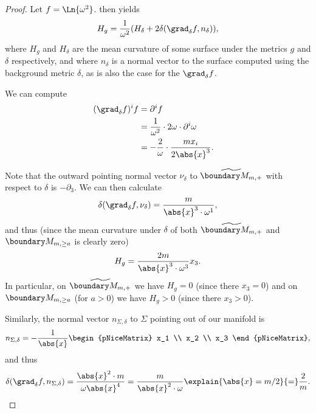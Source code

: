 \documentclass[titlepage,numbers=noenddot,oneside,%
cleardoublepage=empty,paper=a4,fontsize=11pt,%
english,%
]{scrartcl}
\begin{document}
\begin{proof}
    Let \( f=\Ln{\omega^2} \).  then yields
    \begin{equation*}
        H_{g}=\frac{1}{\omega^2}(H_{\delta}+2 \delta(\grad_\delta f,n_\delta)),
    \end{equation*}
    where \( H_g \) and \( H_\delta \) are the mean curvature of some surface under the metrics \( g \) and \( \delta \) respectively, and where \( n_\delta \) is a normal vector to the surface computed using the background metric \( \delta \), as is also the case for the \( \grad_{\delta} f \).

    We can compute
    \begin{align*}
        &(\grad_\delta f)^i f\begin{aligned}[t]
            &=\partial^i f\\
            &=\frac{1}{\omega^2}\cdot2 \omega\cdot \partial^i \omega\\
            &=-\frac{2}{\omega}\cdot \frac{m x_i}{2\abs{x}^3}.
        \end{aligned}
    \end{align*}
    
    Note that the outward pointing normal vector \( \nu_\delta \) to \( \schwarzschildboundary \) with respect to \( \delta \) is \( -\partial_3 \).  We can then calculate
    \begin{equation*}
        \delta(\grad_\delta f,\nu_\delta)=\frac{m}{\abs{x}^3\cdot \omega^1},
    \end{equation*}
    and thus (since the mean curvature under \( \delta \) of both \( \schwarzschildboundary \) and \( \modifiedschwarzschildboundary \) is clearly zero)
    \begin{equation*}
        H_g=\frac{2m}{\abs{x}^3\cdot \omega^3}x_3.
    \end{equation*}
    In particular, on \( \schwarzschildboundary \) we have \( H_g=0 \) (since there \( x_3=0 \)) and on \( \modifiedschwarzschildboundary \) (for \( a>0 \)) we have \( H_g>0 \) (since there \( x_3>0 \)).

    Similarly, the normal vector \( n_{\Sigma,\delta} \) to \( \Sigma \) pointing out of our manifold is
    \begin{equation*}
        n_{\Sigma,\delta} =-\frac{1}{\abs{x}} \begin{pNiceMatrix} x_1 \\ x_2 \\ x_3 \end{pNiceMatrix},
    \end{equation*}
    and thus
    \begin{equation*}
        \delta(\grad_\delta f,n_{\Sigma,\delta})=\frac{\abs{x}^2\cdot m}{\omega\abs{x}^4}=\frac{m}{\abs{x}^2\cdot \omega}\explain{\abs{x}=m/2}{=}\frac{2}{m}.
    \end{equation*}


\end{proof}
\end{document}
